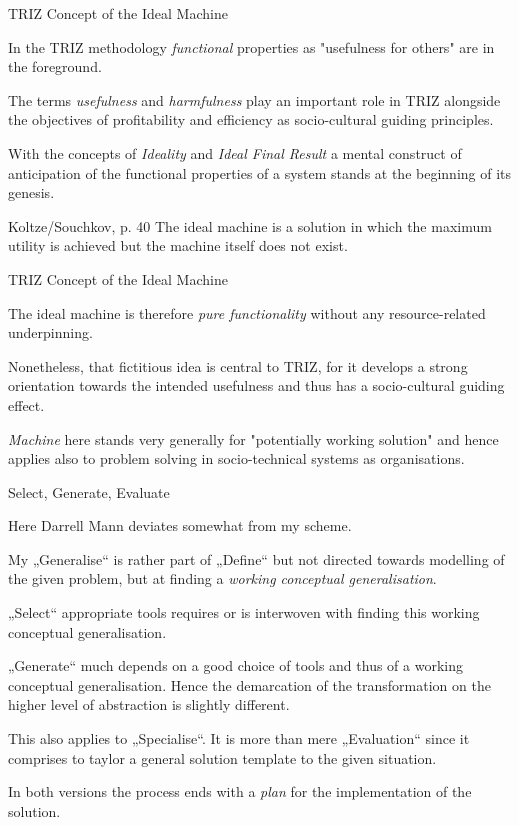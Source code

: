 \documentclass{beamer}
\begin{document}
\begin{frame}{TRIZ Concept of the Ideal Machine}

In the TRIZ methodology \emph{functional} properties as "usefulness for
others" are in the foreground.

The terms \emph{usefulness} and \emph{harmfulness} play an important role in
TRIZ alongside the objectives of profitability and efficiency as
socio-cultural guiding principles.

With the concepts of \emph{Ideality} and \emph{Ideal Final Result} a mental
construct of anticipation of the functional properties of a system stands at
the beginning of its genesis.
\begin{block}{Koltze/Souchkov, p. 40}
  The ideal machine is a solution in which the maximum utility is achieved but
  the machine itself does not exist. 
\end{block}
\end{frame}

\begin{frame}{TRIZ Concept of the Ideal Machine}

The ideal machine is therefore \emph{pure functionality} without any
resource-related underpinning.

Nonetheless, that fictitious idea is central to TRIZ, for it develops a strong
orientation towards the intended usefulness and thus has a socio-cultural
guiding effect.

\emph{Machine} here stands very generally for "potentially working solution"
and hence applies also to problem solving in socio-technical systems as
organisations.
\end{frame}

\begin{frame}{Select, Generate, Evaluate}\small

Here Darrell Mann deviates somewhat from my scheme.

My „Generalise“ is rather part of „Define“ but not directed towards modelling
of the given problem, but at finding a \emph{working conceptual
  generalisation}.

„Select“ appropriate tools requires or is interwoven with finding this working
conceptual generalisation.

„Generate“ much depends on a good choice of tools and thus of a working
conceptual generalisation.  Hence the demarcation of the transformation on the
higher level of abstraction is slightly different.  

This also applies to „Specialise“. It is more than mere „Evaluation“ since it
comprises to taylor a general solution template to the given situation.

In both versions the process ends with a \emph{plan} for the implementation of
the solution.

\end{frame}
\end{document}
